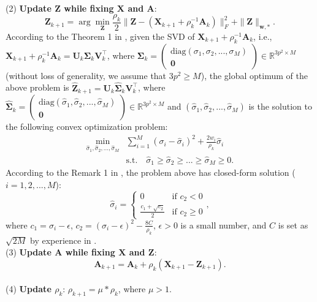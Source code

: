 \\
(2) \textbf{Update $\mathbf{Z}$ while fixing $\mathbf{X}$ and $\mathbf{A}$}:
\begin{equation}
\label{equ4-14}
\mathbf{Z}_{k+1}
=
\arg\min_{\mathbf{Z}}\frac{\rho_{k}}{2}
\|\mathbf{Z} - (\mathbf{X}_{k+1}+\rho_{k}^{-1}\mathbf{A}_{k})\|_{F}^{2}
+
\|\mathbf{Z}\|_{\bm{w},*}.
\end{equation}
According to the Theorem 1 in \cite{wnnmijcv}, given the SVD of $\mathbf{X}_{k+1}+\rho_{k}^{-1}\mathbf{A}_{k}$, i.e., $\mathbf{X}_{k+1}+\rho_{k}^{-1}\mathbf{A}_{k}=\mathbf{U}_{k}\mathbf{\Sigma}_{k}\mathbf{V}_{k}^{\top}$, where 
$\mathbf{\Sigma}_{k}=
\left( \begin{array}{c}
\text{diag}(\sigma_{1},\sigma_{2},...,\sigma_{M})
\\
\mathbf{0}
\end{array} \right)
\in\mathbb{R}^{3p^{2}\times M}$ (without loss of generality, we assume that $3p^{2}\ge M$),
the global optimum of the above problem is 
$\hat{\mathbf{Z}}_{k+1}=\mathbf{U}_{k}\hat{\mathbf{\Sigma}}_{k}\mathbf{V}_{k}^{\top}$, where 
$\hat{\mathbf{\Sigma}}_{k}=
\left( \begin{array}{c}
\text{diag}(\hat{\sigma}_{1},\hat{\sigma}_{2},...,\hat{\sigma}_{M})
\\
\mathbf{0}
\end{array} \right)
\in\mathbb{R}^{3p^{2}\times M}$
and $(\hat{\sigma}_{1},\hat{\sigma}_{2},...,\hat{\sigma}_{M})$ is the solution to the following convex optimization problem:
\begin{equation}
\label{equ4-15}
\begin{split}
\min_{\hat{\sigma}_{1},\hat{\sigma}_{2},...,\hat{\sigma}_{M}}
&
\sum\nolimits_{i=1}^{M}
(\sigma_{i}-\hat{\sigma}_{i})^{2}
+
\frac{2w_{i}}{\rho_{k}}\hat{\sigma}_{i}
\\
&
\text{s.t.}
\quad
\hat{\sigma}_{1}\ge \hat{\sigma}_{2} \ge...\ge \hat{\sigma}_{M}\ge 0.
\end{split}
\end{equation}
According to the Remark 1 in \cite{wnnmijcv}, the problem above has closed-form solution ($i=1,2,...,M$):
\begin{equation}
\label{equ4-16}
\hat{\sigma}_{i}
=
\left\{ \begin{array}{ll}
0 & \textrm{if $c_{2}<0$}\\
\frac{c_{1}+\sqrt{c_{2}}}{2} & \textrm{if $c_{2}\ge 0$}
\end{array} \right.,
\end{equation}
where $c_{1}=\sigma_{i}-\epsilon$, $c_{2} = (\sigma_{i}-\epsilon)^{2}-\frac{8C}{\rho_{k}}$, $\epsilon>0$ is a small number, and $C$ is set as $\sqrt{2M}$ by experience in \cite{wnnmijcv}.
 \\
(3) \textbf{Update $\mathbf{A}$ while fixing $\mathbf{X}$ and $\mathbf{Z}$}:
\begin{equation}
\label{equ4-17}
\mathbf{A}_{k+1}
=
\mathbf{A}_{k} + \rho_{k}(\mathbf{X}_{k+1}-\mathbf{Z}_{k+1}).
\end{equation}
\\
(4) \textbf{Update $\rho_{k}$}: $\rho_{k+1}= \mu * \rho_{k}$, where $\mu>1$.


